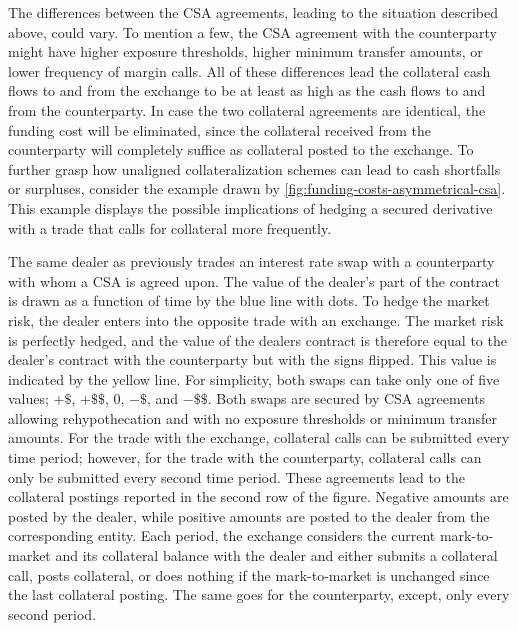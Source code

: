\documentclass[main.tex]{subfiles}
\begin{document}
        The differences between the CSA agreements, leading to the situation described above, could vary. 
        To mention a few, the CSA agreement with the counterparty might have higher exposure thresholds, 
        higher minimum transfer amounts, or lower frequency of margin calls.
        All of these differences lead the collateral cash flows to and from the exchange 
        to be at least as high as the cash flows to and from the counterparty. 
        In case the two collateral agreements are identical, the funding cost will be eliminated, 
        since the collateral received from the counterparty will completely suffice as collateral posted to the exchange.        
        To further grasp how unaligned collateralization schemes can lead to cash shortfalls or surpluses, 
        consider the example drawn by \cref{fig:funding-costs-asymmetrical-csa}.
        This example displays the possible implications of hedging a secured derivative
        with a trade that calls for collateral more frequently.

        The same dealer as previously trades an interest rate swap with a counterparty with whom a CSA is agreed upon. 
        The value of the dealer's part of the contract is drawn as a function of time by the blue line with dots.
        To hedge the market risk, the dealer enters into the opposite trade with an exchange.
        The market risk is perfectly hedged, and the value of the dealers contract is therefore
        equal to the dealer's contract with the counterparty but with the signs flipped.
        This value is indicated by the yellow line.
        For simplicity, both swaps can take only one of five values; $+\$$, $+\$\$$, $0$, $-\$$, and $-\$\$$.
        Both swaps are secured by CSA agreements allowing rehypothecation 
        and with no exposure thresholds or minimum transfer amounts.
        For the trade with the exchange, collateral calls can be submitted every time period;
        however, for the trade with the counterparty, collateral calls can only be submitted every second time period.
        These agreements lead to the collateral postings reported in the second row of the figure.
        Negative amounts are posted by the dealer, while positive amounts are posted to the dealer 
        from the corresponding entity.
        Each period, the exchange considers the current mark-to-market and its collateral balance with the dealer
        and either submits a collateral call, posts collateral, 
        or does nothing if the mark-to-market is unchanged since the last collateral posting.
        The same goes for the counterparty, except, only every second period.
\end{document}
